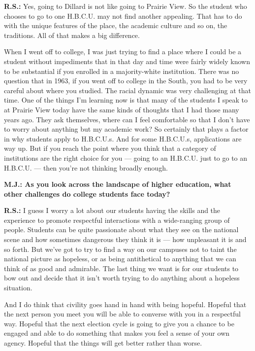 \textbf{R.S.:} Yes, going to Dillard is not like going to Prairie View.
So the student who chooses to go to one H.B.C.U. may not find another
appealing. That has to do with the unique features of the place, the
academic culture and so on, the traditions. All of that makes a big
difference.

When I went off to college, I was just trying to find a place where I
could be a student without impediments that in that day and time were
fairly widely known to be substantial if you enrolled in a
majority-white institution. There was no question that in 1963, if you
went off to college in the South, you had to be very careful about where
you studied. The racial dynamic was very challenging at that time. One
of the things I'm learning now is that many of the students I speak to
at Prairie View today have the same kinds of thoughts that I had those
many years ago. They ask themselves, where can I feel comfortable so
that I don't have to worry about anything but my academic work? So
certainly that plays a factor in why students apply to H.B.C.U.s. And
for some H.B.C.U.s, applications are way up. But if you reach the point
where you think that a category of institutions are the right choice for
you --- going to an H.B.C.U. just to go to an H.B.C.U. --- then you're
not thinking broadly enough.

\textbf{M.J.: As you look across the landscape of higher education, what
other challenges do college students face today?}

\textbf{R.S.:} I guess I worry a lot about our students having the
skills and the experience to promote respectful interactions with a
wide-ranging group of people. Students can be quite passionate about
what they see on the national scene and how sometimes dangerous they
think it is --- how unpleasant it is and so forth. But we've got to try
to find a way on our campuses not to taint the national picture as
hopeless, or as being antithetical to anything that we can think of as
good and admirable. The last thing we want is for our students to bow
out and decide that it isn't worth trying to do anything about a
hopeless situation.

And I do think that civility goes hand in hand with being hopeful.
Hopeful that the next person you meet you will be able to converse with
you in a respectful way. Hopeful that the next election cycle is going
to give you a chance to be engaged and able to do something that makes
you feel a sense of your own agency. Hopeful that the things will get
better rather than worse.

